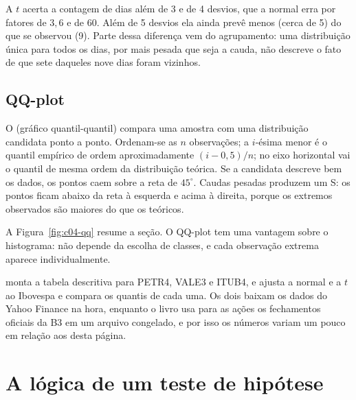 A $t$ acerta a contagem de dias além de 3 e de 4 desvios, que a normal erra por fatores de $3,6$ e de 60. Além de 5 desvios ela ainda prevê menos (cerca de 5) do que se observou (9). Parte dessa diferença vem do agrupamento: uma distribuição única para todos os dias, por mais pesada que seja a cauda, não descreve o fato de que sete daqueles nove dias foram vizinhos.

\subsection{QQ-plot}

O  (gráfico quantil-quantil) compara uma amostra com uma distribuição candidata ponto a ponto. Ordenam-se as $n$ observações; a $i$-ésima menor é o quantil empírico de ordem aproximadamente $(i - 0,5)/n$; no eixo horizontal vai o quantil de mesma ordem da distribuição teórica. Se a candidata descreve bem os dados, os pontos caem sobre a reta de $45^\circ$. Caudas pesadas produzem um S: os pontos ficam abaixo da reta à esquerda e acima à direita, porque os extremos observados são maiores do que os teóricos.

A Figura~\ref{fig:c04-qq} resume a seção. O QQ-plot tem uma vantagem sobre o histograma: não depende da escolha de classes, e cada observação extrema aparece individualmente.


\begin{repositorio}
 monta a tabela descritiva para PETR4, VALE3 e ITUB4, e  ajusta a normal e a $t$ ao Ibovespa e compara os quantis de cada uma. Os dois baixam os dados do Yahoo Finance na hora, enquanto o livro usa para as ações os fechamentos oficiais da B3 em um arquivo congelado, e por isso os números variam um pouco em relação aos desta página.
\end{repositorio}

\section{A lógica de um teste de hipótese}
\label{sec:c04-teste}

